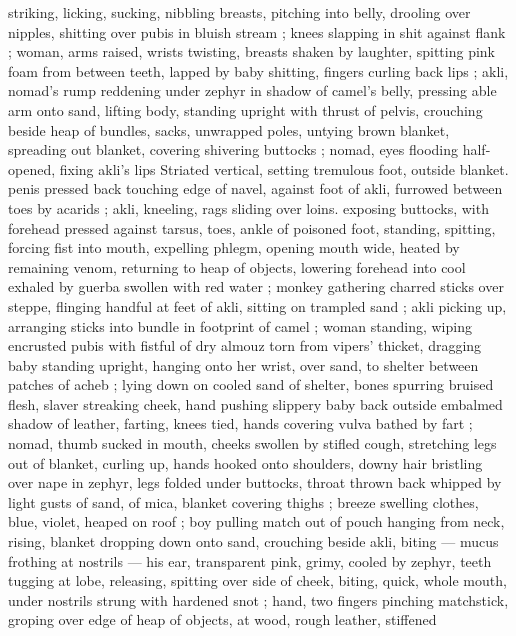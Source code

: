 striking, licking, sucking, nibbling breasts, pitching into belly, 
drooling over nipples, shitting over pubis in bluish stream ; knees 
slapping in shit against flank ; woman, arms raised, wrists twisting, 
breasts shaken by laughter, spitting pink foam from between teeth, 
lapped by baby shitting, fingers curling back lips ; akli, nomad's 
rump reddening under zephyr in shadow of camel's belly, pressing 
able arm onto sand, lifting body, standing upright with thrust of 
pelvis, crouching beside heap of bundles, sacks, unwrapped poles, 
untying brown blanket, spreading out blanket, covering shivering 
buttocks ; nomad, eyes flooding half-opened, fixing akli's lips 
Striated vertical, setting tremulous foot, outside blanket. penis 
pressed back touching edge of navel, against foot of akli, furrowed 
between toes by acarids ; akli, kneeling, rags sliding over loins. 
exposing buttocks, with forehead pressed against tarsus, toes, ankle 
of poisoned foot, standing, spitting, forcing fist into mouth, expelling 
phlegm, opening mouth wide, heated by remaining venom, returning 
to heap of objects, lowering forehead into cool exhaled by guerba 
swollen with red water ; monkey gathering charred sticks over 
steppe, flinging handful at feet of akli, sitting on trampled sand ; akli 
picking up, arranging sticks into bundle in footprint of camel ; woman 
standing, wiping encrusted pubis with fistful of dry almouz torn from 
vipers' thicket, dragging baby standing upright, hanging onto her 
wrist, over sand, to shelter between patches of acheb ; lying down on 
cooled sand of shelter, bones spurring bruised flesh, slaver 
streaking cheek, hand pushing slippery baby back outside embalmed 
shadow of leather, farting, knees tied, hands covering vulva bathed 
by fart ; nomad, thumb sucked in mouth, cheeks swollen by stifled 
cough, stretching legs out of blanket, curling up, hands hooked onto 
shoulders, downy hair bristling over nape in zephyr, legs folded 
under buttocks, throat thrown back whipped by light gusts of sand, 
of mica, blanket covering thighs ; breeze swelling clothes, blue, 
violet, heaped on roof ; boy pulling match out of pouch hanging from 
neck, rising, blanket dropping down onto sand, crouching beside akli, 
biting --- mucus frothing at nostrils --- his ear, transparent pink, 
grimy, cooled by zephyr, teeth tugging at lobe, releasing, spitting 
over side of cheek, biting, quick, whole mouth, under nostrils strung 
with hardened snot ; hand, two fingers pinching matchstick, groping 
over edge of heap of objects, at wood, rough leather, stiffened 
